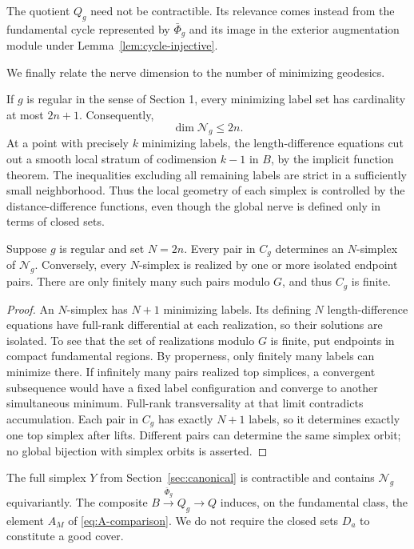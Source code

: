The quotient $Q_g$ need not be contractible. Its relevance
comes instead from the fundamental cycle represented by
$\bar\Phi_g$ and its image in the exterior augmentation
module under Lemma~\ref{lem:cycle-injective}.

We finally relate the nerve dimension to the number of minimizing geodesics.

If $g$ is regular in the sense of Section 1, every minimizing
label set has cardinality at most $2n+1$. Consequently,
\[
 \dim\mathcal N_g\leq2n.
\]
At a point with precisely $k$ minimizing labels, the
length-difference equations cut out a smooth local stratum
of codimension $k-1$ in $B$, by the implicit function
theorem. The inequalities excluding all remaining labels
are strict in a sufficiently small neighborhood.
Thus the local geometry of each simplex is controlled
by the distance-difference functions, even though the
global nerve is defined only in terms of closed sets.

\begin{proposition}\label{prop:top-simplex}
Suppose $g$ is regular and set $N=2n$.
Every pair in $C_g$ determines an $N$-simplex
of $\mathcal N_g$. Conversely, every $N$-simplex
is realized by one or more isolated endpoint pairs.
There are only finitely many such pairs modulo $G$,
and thus $C_g$ is finite.
\end{proposition}

\begin{proof}
An $N$-simplex has $N+1$ minimizing labels.
Its defining $N$ length-difference equations have
full-rank differential at each realization, so their
solutions are isolated. To see that the set of
realizations modulo $G$ is finite, put endpoints
in compact fundamental regions. By properness,
only finitely many labels can minimize there.
If infinitely many pairs realized top simplices,
a convergent subsequence would have a fixed
label configuration and converge to another
simultaneous minimum. Full-rank transversality
at that limit contradicts accumulation.
Each pair in $C_g$ has exactly $N+1$ labels,
so it determines exactly one top simplex after lifts.
Different pairs can determine the same simplex
orbit; no global bijection with simplex orbits
is asserted.
\end{proof}

\begin{remark}\label{rem:nerve-geometry}
The full simplex $Y$ from Section~\ref{sec:canonical}
is contractible and contains $\mathcal N_g$ equivariantly.
The composite
$B\xrightarrow{\bar\Phi_g}Q_g\to Q$
induces, on the fundamental class, the element
$A_M$ of \eqref{eq:A-comparison}. We do not require
the closed sets $D_a$ to constitute a good cover.
\end{remark}
